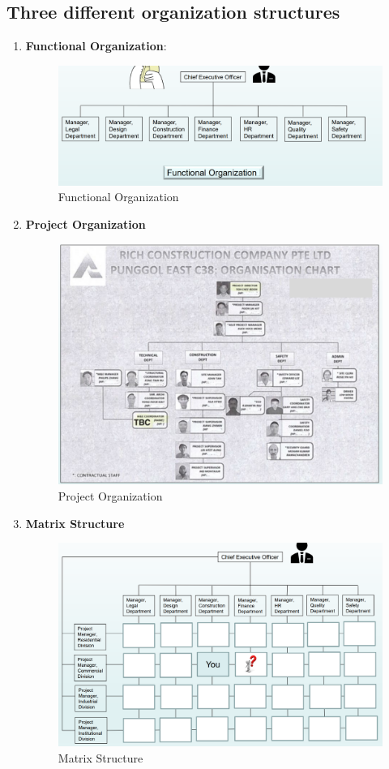 \documentclass[math,code]{amznotes}
\theoremstyle{remark}
\begin{document}
\subsection{Three different organization structures}
\begin{enumerate}
    \item \textbf{Functional Organization}: \\
    \begin{figure}[h]
        \centering
        \includegraphics[width=0.75\linewidth]{images/chapter2-functional-organization.png}
        \caption{Functional Organization}
        \label{fig:chapter2-functional-organization}
    \end{figure}
    \item \textbf{Project Organization} \\
    \begin{figure}[h]
        \centering
        \includegraphics[width=0.75\linewidth]{chapter2-project-organization.png}
        \caption{Project Organization}
        \label{fig:chapter2-project-organization}
    \end{figure}
    \item \textbf{Matrix Structure} \\
    \begin{figure}[h]
        \centering
        \includegraphics[width=0.75\linewidth]{images/chapter2-matrix-structure.png}
        \caption{Matrix Structure}
        \label{fig:chapter2-matrix-structure}
    \end{figure}
\end{enumerate}
\end{document}
